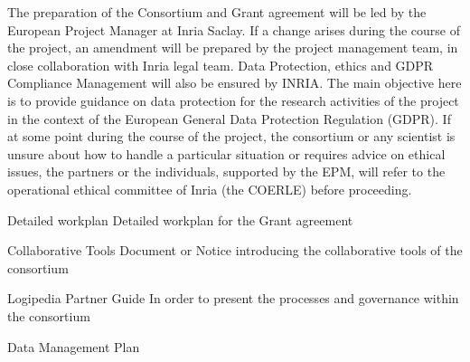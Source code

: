 \begin{workpackage}[id=management,type=MGT,wphases=1-48,
  short=Management,
  title=Management,
  lead=Inr,InrRM=40,InnRM=2,SacRM=2,TumRM=2,LieRM=2,BelRM=2,DelRM=2,FauRM=2]
\begin{tasklist}
  \begin{task}[id=legal,title={Legal Management (data, ethics, GDPR)},shorttitle={Legal Management (data, ethics, GDPR)},
      lead=Inr,InrRM=4,wphases=1-48]
    The preparation of the Consortium and Grant agreement will be led
    by the European Project Manager at Inria Saclay. If a change
    arises during the course of the project, an amendment will be
    prepared by the project management team, in close collaboration
    with Inria legal team.  Data Protection, ethics and GDPR
    Compliance Management will also be ensured by INRIA. The main
    objective here is to provide guidance on data protection for the
    research activities of the project in the context of the European
    General Data Protection Regulation (GDPR). If at some point during
    the course of the project, the consortium or any scientist is
    unsure about how to handle a particular situation or requires
    advice on ethical issues, the partners or the individuals,
    supported by the EPM, will refer to the operational ethical
    committee of Inria (the COERLE) before proceeding.
  \end{task}

  
\end{tasklist}

\begin{wpdelivs}
  \begin{wpdeliv}[due=2,id=workplan,dissem=PU,nature=R,lead=Inr]{Detailed
      workplan} Detailed workplan for the Grant agreement
  \end{wpdeliv}

  \begin{wpdeliv}[due=2,id=collab-tools,dissem=PU,nature=R,lead=Inr]{Collaborative Tools}
    Document or Notice introducing the collaborative tools of the consortium
  \end{wpdeliv}

  \begin{wpdeliv}[due=3,id=guide,dissem=PU,nature=R,lead=Inr]{Logipedia Partner Guide}
    In order to present the processes and governance within the consortium
  \end{wpdeliv}

  \begin{wpdeliv}[due=4,id=data-plan,dissem=PU,nature=R,lead=Inr]{Data
      Management Plan}
  \end{wpdeliv}
\end{wpdelivs}

\end{workpackage}


